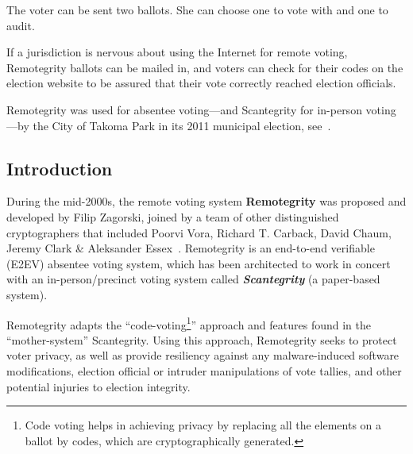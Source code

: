 The voter can be sent two ballots. She can choose one to vote with and
one to audit.

If a jurisdiction is nervous about using the Internet for remote
voting, Remotegrity ballots can be mailed in, and voters can check for
their codes on the election website to be assured that their vote
correctly reached election officials.

Remotegrity was used for absentee voting---and Scantegrity for
in-person voting---by the City of Takoma Park in its 2011 municipal
election, see~\cite{zagorski2013}.

\subsection{Introduction}

During the mid-2000s, the remote voting system \textbf{Remotegrity
}was proposed and developed by Filip Zagorski, joined by a team of
other distinguished cryptographers that included Poorvi Vora, Richard
T. Carback, David Chaum, Jeremy Clark \& Aleksander
Essex~\cite{zagorski2013}. Remotegrity is an end-to-end verifiable
(E2EV) absentee voting system, which has been architected to work in
concert with an in-person/precinct voting system called
\textbf{\textit{Scantegrity }}(a paper-based system).

Remotegrity adapts the ``code-voting\footnote{Code voting helps in
  achieving privacy by replacing all the elements on a ballot by
  codes, which are cryptographically generated.}'' approach and
features found in the ``mother-system'' Scantegrity. Using this
approach, Remotegrity seeks to protect voter privacy, as well as
provide resiliency against any malware-induced software modifications,
election official or intruder manipulations of vote tallies, and other
potential injuries to election integrity.

